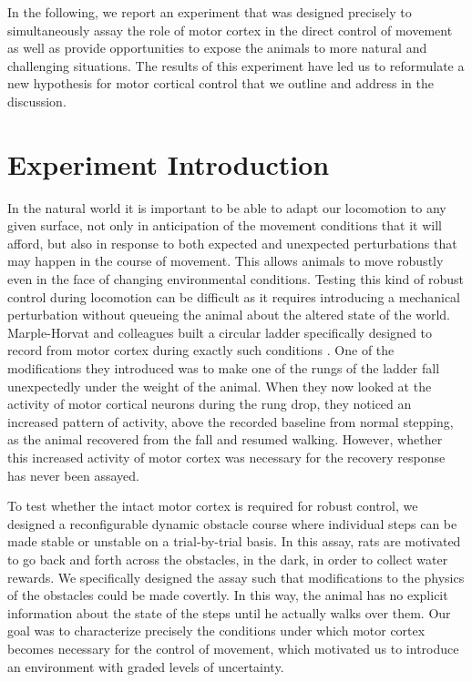 In the following, we report an experiment that was designed precisely to simultaneously assay the role of motor cortex in the direct control of movement as well as provide opportunities to expose the animals to more natural and challenging situations. The results of this experiment have led us to reformulate a new hypothesis for motor cortical control that we outline and address in the discussion.

\section{Experiment Introduction}

In the natural world it is important to be able to adapt our locomotion to any given surface, not only in anticipation of the movement conditions that it will afford, but also in response to both expected and unexpected perturbations that may happen in the course of movement. This allows animals to move robustly even in the face of changing environmental conditions. Testing this kind of robust control during locomotion can be difficult as it requires introducing a mechanical perturbation without queueing the animal about the altered state of the world. Marple-Horvat and colleagues built a circular ladder specifically designed to record from motor cortex during exactly such conditions \cite{Marple-Horvat1993}. One of the modifications they introduced was to make one of the rungs of the ladder fall unexpectedly under the weight of the animal. When they now looked at the activity of motor cortical neurons during the rung drop, they noticed an increased pattern of activity, above the recorded baseline from normal stepping, as the animal recovered from the fall and resumed walking. However, whether this increased activity of motor cortex was necessary for the recovery response has never been assayed.

To test whether the intact motor cortex is required for robust control, we designed a reconfigurable dynamic obstacle course where individual steps can be made stable or unstable on a trial-by-trial basis. In this assay, rats are motivated to go back and forth across the obstacles, in the dark, in order to collect water rewards. We specifically designed the assay such that modifications to the physics of the obstacles could be made covertly. In this way, the animal has no explicit information about the state of the steps until he actually walks over them. Our goal was to characterize precisely the conditions under which motor cortex becomes necessary for the control of movement, which motivated us to introduce an environment with graded levels of uncertainty.

